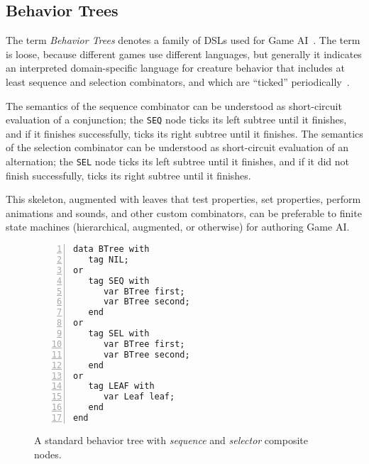 \documentclass{acm_proc_article-sp}
\newcommand{\code}[1] {{\small{\texttt{#1}}}}
\begin{document}
\subsection{Behavior Trees}

The term \emph{Behavior Trees} denotes a family of DSLs used for Game 
AI~\cite{TODO}.
The term is loose, because different games use different languages,
but generally it indicates an interpreted domain-specific language
for creature behavior that includes at least sequence and selection combinators,
and which are ``ticked'' periodically~\cite{TODO}.


The semantics of the sequence combinator can be understood as short-circuit evaluation of a conjunction;
the \code{SEQ} node ticks its left subtree until it finishes,
and if it finishes successfully, ticks its right subtree until it finishes.
The semantics of the selection combinator can be understood as short-circuit evaluation of an alternation;
the \code{SEL} node ticks its left subtree until it finishes,
and if it did not finish successfully, ticks its right subtree until it finishes.

This skeleton, augmented with leaves that test properties, set properties, perform animations and sounds,
and other custom combinators, can be preferable to finite state machines (hierarchical, augmented, or otherwise) for authoring Game AI.

\begin{figure}%
\begin{lstlisting}[numbers=left,xleftmargin=3em]
data BTree with
   tag NIL;
or
   tag SEQ with
      var BTree first;
      var BTree second;
   end
or
   tag SEL with
      var BTree first;
      var BTree second;
   end
or
   tag LEAF with
      var Leaf leaf;
   end
end

\end{lstlisting}
\caption{ A standard behavior tree with \emph{sequence} and \emph{selector}
          composite nodes.
\label{lst.bt1}
}
\end{figure}
\end{document}
